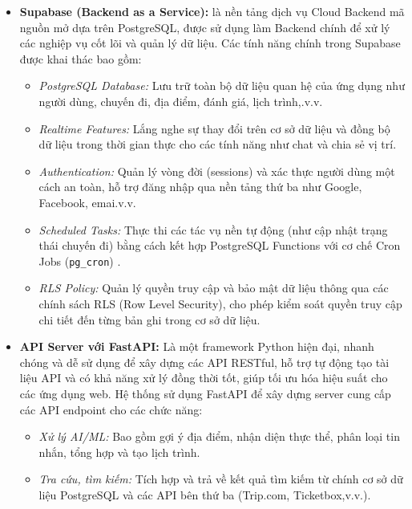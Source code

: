 \begin{itemize}
    \item \textbf{Supabase (Backend as a Service)\cite{supabase_doc}:}
    là nền tảng dịch vụ Cloud Backend mã nguồn mở dựa trên PostgreSQL, được sử dụng làm Backend chính để xử lý các nghiệp vụ cốt lõi và quản lý dữ liệu. Các tính năng chính trong Supabase được khai thác bao gồm:
        \begin{itemize}
            \item \textit{PostgreSQL Database:} Lưu trữ toàn bộ dữ liệu quan hệ của ứng dụng như người dùng, chuyến đi, địa điểm, đánh giá, lịch trình,.v.v.
                        \item \textit{Realtime Features:} Lắng nghe sự thay đổi trên cơ sở dữ liệu và đồng bộ dữ liệu trong thời gian thực cho các tính năng như chat và chia sẻ vị trí.
                        \item \textit{Authentication:} Quản lý vòng đời (sessions) và xác thực người dùng một cách an toàn, hỗ trợ đăng nhập qua nền tảng thứ ba như Google, Facebook, emai.v.v.
                        \item \textit{Scheduled Tasks:} Thực thi các tác vụ nền tự động (như cập nhật trạng thái chuyến đi) bằng cách kết hợp PostgreSQL Functions với cơ chế Cron Jobs (\texttt{pg\_cron}) .
                        \item \textit{RLS Policy:}  Quản lý quyền truy cập và bảo mật dữ liệu thông qua các chính sách RLS (Row Level Security), cho phép kiểm soát quyền truy cập chi tiết đến từng bản ghi trong cơ sở dữ liệu.
        \end{itemize}

    \item \textbf{API Server với FastAPI\cite{fastapi_doc}:}
 Là một framework Python hiện đại, nhanh chóng và dễ sử dụng để xây dựng các API RESTful, hỗ trợ tự động tạo tài liệu API và có khả năng xử lý đồng thời tốt, giúp tối ưu hóa hiệu suất cho các ứng dụng web. Hệ thống sử dụng FastAPI để xây dựng server cung cấp các API endpoint cho các chức năng:
        \begin{itemize}
             \item \textit{Xử lý AI/ML:} Bao gồm gợi ý địa điểm, nhận diện thực thể, phân loại tin nhắn, tổng hợp và tạo lịch trình.
             \item \textit{Tra cứu, tìm kiếm:} Tích hợp và trả về kết quả tìm kiếm từ chính cơ sở dữ liệu PostgreSQL và các API bên thứ ba (Trip.com, Ticketbox,v.v.).
        \end{itemize}
        

\end{itemize}

